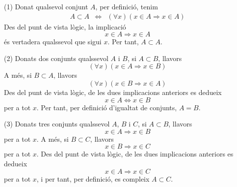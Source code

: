 \begin{solucio}
(1) Donat qualsevol conjunt $A$, per definici\'{o}, tenim%
\begin{equation*}
\begin{array}{ccc}
A\subset A & \Longleftrightarrow & \left( \forall x\right) \left( x\in
A\Longrightarrow x\in A\right)%
\end{array}%
\end{equation*}%
Des del punt de vista l\`{o}gic, la implicaci\'{o}%
\begin{equation*}
x\in A\Longrightarrow x\in A
\end{equation*}%
\'{e}s vertadera qualssevol que sigui $x$. Per tant, $A\subset A$.

(2) Donats dos conjunts qualssevol $A$ i $B$, si $A\subset B$, llavors%
\begin{equation*}
\left( \forall x\right) \left( x\in A\Longrightarrow x\in B\right)
\end{equation*}%
A m\'{e}s, si $B\subset A$, llavors%
\begin{equation*}
\left( \forall x\right) \left( x\in B\Longrightarrow x\in A\right)
\end{equation*}%
Des del punt de vista l\`{o}gic, de les dues implicacions anteriors es
dedueix%
\begin{equation*}
x\in A\Longleftrightarrow x\in B
\end{equation*}%
per a tot $x$. Per tant, per definici\'{o} d'igualtat de conjunts, $A=B$.

(3) Donats tres conjunts qualssevol $A$, $B$ i $C$, si $A\subset B$, llavors%
\begin{equation*}
x\in A\Longrightarrow x\in B
\end{equation*}%
per a tot $x$. A m\'{e}s, si $B\subset C$, llavors%
\begin{equation*}
x\in B\Longrightarrow x\in C
\end{equation*}%
per a tot $x$. Des del punt de vista l\`{o}gic, de les dues implicacions
anteriors es dedueix%
\begin{equation*}
x\in A\Longrightarrow x\in C
\end{equation*}%
per a tot $x$, i per tant, per definici\'{o}, es compleix $A\subset C$.
\end{solucio}


